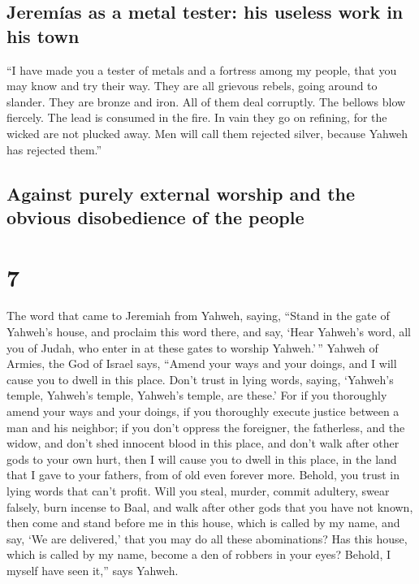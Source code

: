 \hypertarget{jeremuxedas-as-a-metal-tester-his-useless-work-in-his-town}{%
\subsection{Jeremías as a metal tester: his useless work in his
town}\label{jeremuxedas-as-a-metal-tester-his-useless-work-in-his-town}}

 ``I have made you a tester of metals and a fortress
among my people, that you may know and try their way. 
They are all grievous rebels, going around to slander. They are bronze
and iron. All of them deal corruptly.  The bellows blow
fiercely. The lead is consumed in the fire. In vain they go on refining,
for the wicked are not plucked away.  Men will call them
rejected silver, because Yahweh has rejected them.''

\hypertarget{against-purely-external-worship-and-the-obvious-disobedience-of-the-people}{%
\subsection{Against purely external worship and the obvious disobedience
of the
people}\label{against-purely-external-worship-and-the-obvious-disobedience-of-the-people}}

\hypertarget{section-6}{%
\section{7}\label{section-6}}

 The word that came to Jeremiah from Yahweh, saying,
 ``Stand in the gate of Yahweh's house, and proclaim this
word there, and say, `Hear Yahweh's word, all you of Judah, who enter in
at these gates to worship Yahweh.'\,''  Yahweh of Armies,
the God of Israel says, ``Amend your ways and your doings, and I will
cause you to dwell in this place.  Don't trust in lying
words, saying, `Yahweh's temple, Yahweh's temple, Yahweh's temple, are
these.'  For if you thoroughly amend your ways and your
doings, if you thoroughly execute justice between a man and his
neighbor;  if you don't oppress the foreigner, the
fatherless, and the widow, and don't shed innocent blood in this place,
and don't walk after other gods to your own hurt,  then I
will cause you to dwell in this place, in the land that I gave to your
fathers, from of old even forever more.  Behold, you trust
in lying words that can't profit.  Will you steal, murder,
commit adultery, swear falsely, burn incense to Baal, and walk after
other gods that you have not known,  then come and stand
before me in this house, which is called by my name, and say, `We are
delivered,' that you may do all these abominations?  Has
this house, which is called by my name, become a den of robbers in your
eyes? Behold, I myself have seen it,'' says Yahweh.

